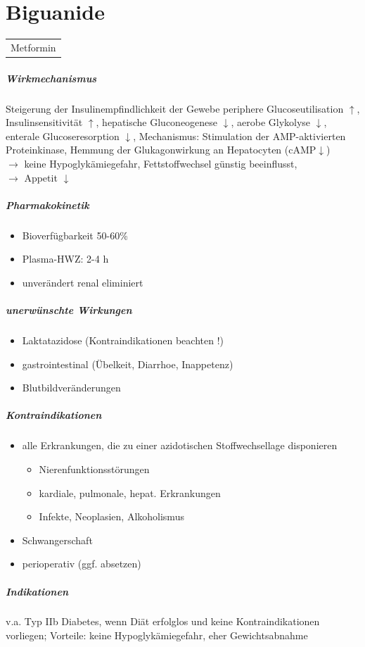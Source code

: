\documentclass[10pt,a4paper]{report}
\begin{document}
\section{Biguanide} %
\label{sec:biguanide}
\begin{tabularx}{\textwidth}{X}
Metformin\\
\end{tabularx}
\subparagraph{Wirkmechanismus} %
\label{subp:wirkmechanismus}
Steigerung der Insulinempfindlichkeit der Gewebe
periphere Glucoseutilisation $\uparrow$, Insulinsensitivität $\uparrow$, hepatische Gluconeogenese $\downarrow$, aerobe Glykolyse $\downarrow$, enterale Glucoseresorption $\downarrow$, 
Mechanismus: Stimulation der AMP-aktivierten Proteinkinase, Hemmung der Glukagonwirkung  an Hepatocyten (cAMP$\downarrow$)\\
$\rightarrow$ keine Hypoglykämiegefahr, Fettstoffwechsel günstig beeinflusst, \\
$\rightarrow$ Appetit $\downarrow$
\subparagraph{Pharmakokinetik} %
\label{subp:pharmakokinetik}
\begin{itemize}
	\item Bioverfügbarkeit 50-60\%
	\item Plasma-HWZ: 2-4 h
	\item unverändert renal eliminiert
\end{itemize}
\subparagraph{unerwünschte Wirkungen} %
\label{subp:uner}
\begin{itemize}
	\item Laktatazidose (Kontraindikationen beachten !)
	\item gastrointestinal (Übelkeit, Diarrhoe, Inappetenz)
	\item Blutbildveränderungen
\end{itemize}
\subparagraph{Kontraindikationen} %
\label{subp:kontraindikationen}
\begin{itemize}
	\item alle Erkrankungen, die zu einer azidotischen Stoffwechsellage disponieren
	\begin{itemize}
		\item Nierenfunktionsstörungen
		\item kardiale, pulmonale, hepat. Erkrankungen
		\item Infekte, Neoplasien, Alkoholismus
	\end{itemize}
	\item Schwangerschaft 
	\item perioperativ (ggf. absetzen)
\end{itemize}
\subparagraph{Indikationen} %
\label{subp:indikationen}
v.a. Typ IIb Diabetes, wenn Diät erfolglos und keine Kontraindikationen vorliegen; Vorteile: keine Hypoglykämiegefahr, eher Gewichtsabnahme
\end{document}
